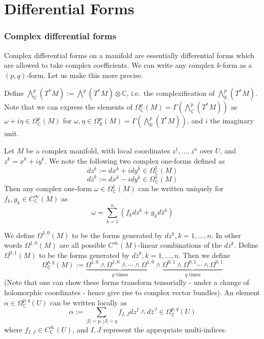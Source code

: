 \documentclass[a4paper]{article}
\theoremstyle{definition} \newtheorem*{definition}{Definition}
\theoremstyle{definition} \newtheorem*{definitions}{Definitions}
\theoremstyle{plain} \newtheorem{theorem}{Theorem}[section]
\theoremstyle{plain} \newtheorem{proposition}[theorem]{Proposition}
\theoremstyle{plain} \newtheorem{corollary}[theorem]{Corollary}
\theoremstyle{plain} \newtheorem{lemma}[theorem]{Lemma}
\theoremstyle{plain} \newtheorem{example}[theorem]{Example}
\newcommand{\realnos}{\mathbb{R}}
\newcommand{\complexnos}{\mathbb{C}}
\newcommand{\smooth}{C^\infty}
\begin{document}
\section{Differential Forms}

\subsubsection{Complex differential forms}
Complex differential forms on a manifold are essentially differential forms which are allowed to take complex coefficients. We can write any complex $k$-form as a $(p,q)$-form. Let us make this more precise.

Define $\bigwedge^p_\complexnos(T^\ast M):=\bigwedge^p (T^\ast M)\otimes \complexnos$, i.e.\ the complexification of $\bigwedge^p_\realnos(T^\ast M)$. Note that we can express the elements of $\Omega^p_\complexnos(M)=\Gamma(\bigwedge^p_\complexnos(T^\ast M))$ as $\omega+i\eta \in \Omega^p_\complexnos(M)$ for $\omega, \eta \in \Omega_\realnos ^p(M) = \Gamma(\bigwedge^p_\realnos(T^\ast M))$, and $i$ the imaginary unit.

Let $M$ be a complex manifold, with local coordinates $z^1, \ldots, z^n$ over $U$, and $z^k=x^k+iy^k$. We note the following two complex one-forms defined as
$$dz^k := dx^k + i dy^k \in \Omega^1_\complexnos (M)$$
$$d\bar{z}^k := dx^k - i dy^k \in \Omega^1_\complexnos (M)$$
Then any complex one-form $\omega\in \Omega^1_\complexnos (M)$ can be written uniquely for $f_k, g_k \in C_\complexnos ^\infty(M)$ as 
$$\omega = \sum_{k=1}^n (f_kdz^k + g_kd\bar{z}^k)$$

We define $\Omega^{1, 0}(M)$ to be the forms generated by $dz^k, k=1, \ldots, n$. In other words $\Omega^{1, 0}(M)$ are all possible $\smooth(M)$-linear combinations of the $dz^k$. Define $\Omega^{0, 1}(M)$ to be the forms generated by $d\bar{z}^k, k=1, \ldots, n$. 
Then we define 
$$\Omega^{p, q}_\complexnos (M) := \underbrace{\Omega^{1, 0} \wedge \Omega^{1, 0} \wedge \cdots \wedge \Omega^{1, 0}}_{p \text{ times}} \wedge \underbrace{\Omega^{0, 1} \wedge \Omega^{0, 1} \cdots \wedge \Omega^{0, 1}}_{q \text{ times}}$$
(Note that one can show these forms transform tensorially - under a change of holomorphic coordinates - hence give rise to complex vector bundles). An element $\alpha\in \Omega^{p,q}_\complexnos(U)$ can be written locally as 
$$\alpha := \sum_{|I|=p, |J|=q} f_{I,J} dz^I \wedge d\bar{z}^J \in \Omega^{p,q}_\complexnos(U)$$
where $f_{I, J}\in \smooth_\complexnos(U)$, and $I, J$ represent the appropriate multi-indices. 
\end{document}
